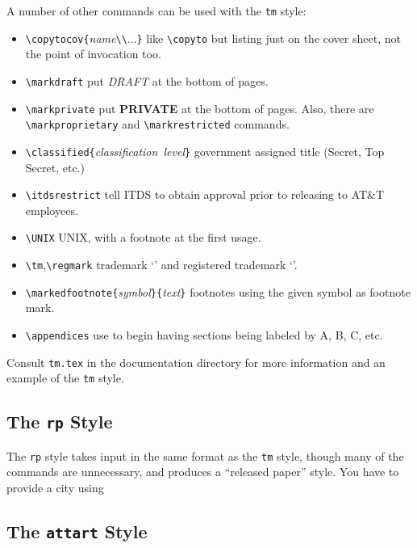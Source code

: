 A number of other commands can be used with the {\tt tm} style:

\begin{itemize}
\item[] \hbox{\verb|\copytocov{|{\em name}\verb|\\|...\verb|}|}
	like \verb|\copyto| but listing just on the cover sheet,
	not the point of invocation too.
\item[] \hbox{\verb|\markdraft|}
	put {\em DRAFT\/} at the bottom of pages.
\item[] \hbox{\verb|\markprivate|}
	put {\bf PRIVATE} at the bottom of pages.
	Also, there are \verb|\markproprietary|
	and \verb|\markrestricted| commands.
\item[] \hbox{\verb|\classified{|{\em classification level}\verb|}|}
	government assigned title (Secret, Top Secret, etc.)
\item[] \hbox{\verb|\itdsrestrict|}
	tell ITDS to obtain approval prior to releasing to
	AT\&T employees.
\item[] \hbox{\verb|\UNIX|}
	UNIX\regmark, with a footnote at the first usage.
\item[] \hbox{\verb|\tm|,\verb|\regmark|}
	trademark `\tm' and registered trademark `\regmark'.
\item[] \hbox{\verb|\markedfootnote{|{\em symbol}\verb|}{|{\em text}\verb|}|}
	footnotes using the given symbol as footnote mark.
\item[] \hbox{\verb|\appendices|}
	use to begin having sections being labeled by A, B, C, etc.
\end{itemize}

Consult \verb|tm.tex| in the documentation directory for more
information and an example of the {\tt tm} style.

\subsection{The {\tt rp} Style}

The {\tt rp} style takes input in the same format as the {\tt tm}
style, though many of the commands are unnecessary, and produces
a ``released paper'' style.
You have to provide a city using
\begin{eg}
\end{eg}

\subsection{The {\tt attart} Style}

